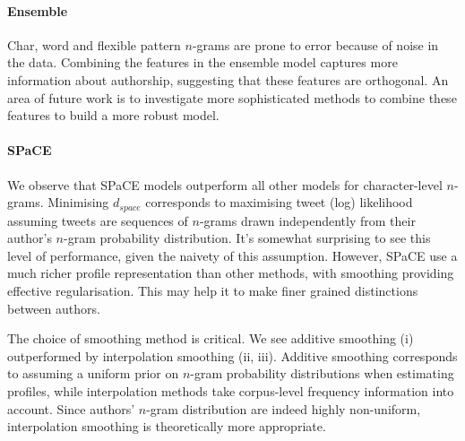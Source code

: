 \documentclass[twocolumn,10pt]{article}
\begin{document}
\paragraph{Ensemble} Char, word and flexible pattern $n$-grams are prone to error because of noise in the data. Combining the features in the ensemble model captures more information about authorship, suggesting that these features are orthogonal. An area of future work is to investigate more sophisticated methods to combine these features to build a more robust model. 



\paragraph{SPaCE} We observe that SPaCE models outperform all other models for
character-level $n$-grams.
Minimising $d_{space}$ corresponds to maximising
tweet (log) likelihood assuming tweets are sequences of
$n$-grams drawn independently from their author's $n$-gram
probability distribution.
It's somewhat surprising to see this level of performance,
given the naivety of this assumption.
However, SPaCE use a much richer profile representation
than other methods, with smoothing providing effective
regularisation. This may help it to make finer grained
distinctions between authors.

The choice of smoothing method is critical.
We see additive smoothing (i) outperformed by interpolation
smoothing (ii, iii).
Additive smoothing corresponds to assuming a uniform prior
on $n$-gram probability distributions when estimating profiles,
while interpolation methods take corpus-level frequency
information into account.
Since authors' $n$-gram distribution are indeed highly
non-uniform, interpolation smoothing is theoretically
more appropriate. %


\printbibliography
\end{document}

